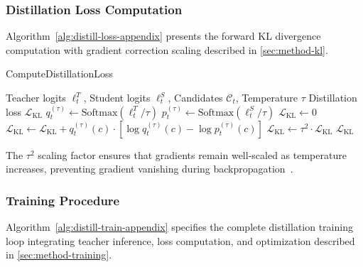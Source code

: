 \subsubsection{Distillation Loss Computation}
\label{app:distill-loss-alg}

Algorithm~\ref{alg:distill-loss-appendix} presents the forward KL divergence computation with gradient correction scaling described in \autoref{sec:method-kl}.

\begin{algorithm}[H]
\caption{ComputeDistillationLoss}
\label{alg:distill-loss-appendix}
\begin{algorithmic}
\Require Teacher logits $\ell^T_t$, Student logits $\ell^S_t$, Candidates $\mathcal{C}_t$, Temperature $\tau$
\Ensure Distillation loss $\mathcal{L}_{\text{KL}}$
\State $q^{(\tau)}_t \gets \text{Softmax}(\ell^T_t / \tau)$ 
\State $p^{(\tau)}_t \gets \text{Softmax}(\ell^S_t / \tau)$ 
\State $\mathcal{L}_{\text{KL}} \gets 0$
     
        \State $\mathcal{L}_{\text{KL}} \gets \mathcal{L}_{\text{KL}} + q^{(\tau)}_t(c) \cdot [\log q^{(\tau)}_t(c) - \log p^{(\tau)}_t(c)]$
    \EndIf
\EndFor
\State $\mathcal{L}_{\text{KL}} \gets \tau^2 \cdot \mathcal{L}_{\text{KL}}$ 
\State \Return $\mathcal{L}_{\text{KL}}$
\end{algorithmic}
\end{algorithm}

The $\tau^2$ scaling factor ensures that gradients remain well-scaled as temperature increases, preventing gradient vanishing during backpropagation~\cite{hintonDistillingKnowledgeNeural2015}.

\subsubsection{Training Procedure}
\label{app:training-alg}

Algorithm~\ref{alg:distill-train-appendix} specifies the complete distillation training loop integrating teacher inference, loss computation, and optimization described in \autoref{sec:method-training}.

